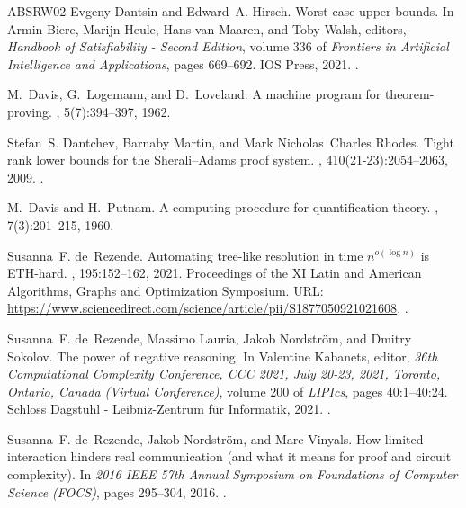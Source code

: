 \documentclass[11pt]{article}
\numberwithin{equation}{section}
\begin{document}
\begin{thebibliography}{ABSRW02}
Evgeny Dantsin and Edward~A. Hirsch.
\newblock Worst-case upper bounds.
\newblock In Armin Biere, Marijn Heule, Hans van Maaren, and Toby Walsh,
  editors, {\em Handbook of Satisfiability - Second Edition}, volume 336 of
  {\em Frontiers in Artificial Intelligence and Applications}, pages 669--692.
  {IOS} Press, 2021.
\newblock \href {https://doi.org/10.3233/FAIA200999}
  {}.

M.~Davis, G.~Logemann, and D.~Loveland.
\newblock A machine program for theorem-proving.
, 5(7):394--397, 1962.

Stefan~S. Dantchev, Barnaby Martin, and Mark Nicholas~Charles Rhodes.
\newblock Tight rank lower bounds for the {S}herali--{A}dams proof system.
, 410(21-23):2054--2063, 2009.
\newblock \href {https://doi.org/10.1016/j.tcs.2009.01.002}
  {}.

M.~Davis and H.~Putnam.
\newblock A computing procedure for quantification theory.
, 7(3):201--215, 1960.

Susanna~F. de~Rezende.
\newblock Automating tree-like resolution in time {$n^{o(\log n)}$} is
  {ETH}-hard.
, 195:152--162, 2021.
\newblock Proceedings of the XI Latin and American Algorithms, Graphs and
  Optimization Symposium.
\newblock URL:
  \url{https://www.sciencedirect.com/science/article/pii/S1877050921021608},
  \href {https://doi.org/https://doi.org/10.1016/j.procs.2021.11.021}
  {}.

Susanna~F. de~Rezende, Massimo Lauria, Jakob Nordstr{\"{o}}m, and Dmitry
  Sokolov.
\newblock The power of negative reasoning.
\newblock In Valentine Kabanets, editor, {\em 36th Computational Complexity
  Conference, {CCC} 2021, July 20-23, 2021, Toronto, Ontario, Canada (Virtual
  Conference)}, volume 200 of {\em LIPIcs}, pages 40:1--40:24. Schloss Dagstuhl
  - Leibniz-Zentrum f{\"{u}}r Informatik, 2021.
\newblock \href {https://doi.org/10.4230/LIPIcs.CCC.2021.40}
  {}.

Susanna~F. de~Rezende, Jakob Nordström, and Marc Vinyals.
\newblock How limited interaction hinders real communication (and what it means
  for proof and circuit complexity).
\newblock In {\em 2016 IEEE 57th Annual Symposium on Foundations of Computer
  Science (FOCS)}, pages 295--304, 2016.
\newblock \href {https://doi.org/10.1109/FOCS.2016.40}
  {}.


\end{thebibliography}
\end{document}

